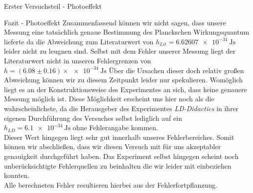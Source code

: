 \documentclass[pdftex, a4paper,11pt, twoside, ngerman]{report}
\begin{document}
\begin{chapter}{Erster Versuchsteil - Photoeffekt}
    \begin{section}{Fazit - Photoeffekt}
      \label{chp:Photoeffekt:sec:Fazit}
      Zusammenfassend können wir nicht sagen, dass unsere Messung eine
      tatsächlich genaue Bestimmung des Planckschen Wirkungsquantum lieferte da
      die Abweichung zum Literaturwert von
      $h_{Lit}=\SI{6.62607e-34}{\joule\second}$ leider nicht zu leugnen sind.
      Selbst mit dem Fehler unserer Messung liegt der Literaturwert nicht in
      unseren Fehlergrenzen von
      $h=(6.08 \pm 0.16)\times\SI{e-34}{\joule\second}$ 
      Über die Ursachen dieser doch relativ großen Abweichung können wir zu 
      diesem Zeitpunkt leider nur spekulieren. Womöglich liegt es an der 
      Konstruktionsweise des Experimentes an sich, dass keine genauere Messung
      möglich ist. Diese Möglichkeit erscheint uns hier noch als die 
      wahrscheinlichste, da die Herausgeber des Experimentes 
      \textit{LD-Didactics} in ihrer eigenen Durchführung des Versuches selbst
      lediglich auf ein $h_{LD}=\SI{6.1e-34}{\joule\second}$ ohne Fehlerangabe
      kommen.\cite{bib:LDDidactic} \\
      Dieser Wert hingegen liegt sehr gut innerhalb unseres Fehlerbereiches.
      Somit können wir abschließen, dass wir diesen Versuch mit für uns
      akzeptabler genauigkeit durchgeführt haben. Das Experiment selbst 
      hingegen scheint noch unberücksichtigte Fehlerquellen zu beinhalten
      die wir leider mit einbeziehen konnten.\\
      Alle berechneten Fehler resultieren hierbei aus der Fehlerfortpflanzung.
      
      
    \end{section}
   
  \end{chapter}
 
 
 
\end{document}
